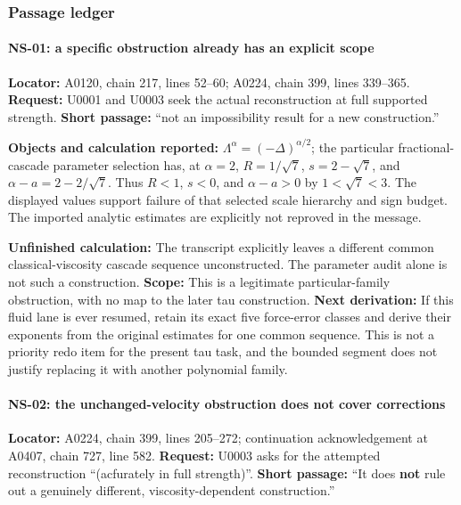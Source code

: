 \documentclass[10pt,a4paper,oneside]{report}
\begin{document}
\subsubsection{Passage ledger}\label{passage-ledger}

\paragraph{NS-01: a specific obstruction already has an explicit
scope}\label{ns-01-a-specific-obstruction-already-has-an-explicit-scope}

\textbf{Locator:} A0120, chain 217, lines 52--60; A0224, chain 399,
lines 339--365. \textbf{Request:} U0001 and U0003 seek the actual
reconstruction at full supported strength. \textbf{Short passage:} ``not
an impossibility result for a new construction.''

\textbf{Objects and calculation reported:}
\(\Lambda^\alpha=(-\Delta)^{\alpha/2}\); the particular
fractional-cascade parameter selection has, at \(\alpha=2\),
\(R=1/\sqrt7\), \(s=2-\sqrt7\), and \(\alpha-a=2-2/\sqrt7\). Thus
\(R<1\), \(s<0\), and \(\alpha-a>0\) by \(1<\sqrt7<3\). The displayed
values support failure of that selected scale hierarchy and sign budget.
The imported analytic estimates are explicitly not reproved in the
message.

\textbf{Unfinished calculation:} The transcript explicitly leaves a
different common classical-viscosity cascade sequence unconstructed. The
parameter audit alone is not such a construction. \textbf{Scope:} This
is a legitimate particular-family obstruction, with no map to the later
tau construction. \textbf{Next derivation:} If this fluid lane is ever
resumed, retain its exact five force-error classes and derive their
exponents from the original estimates for one common sequence. This is
not a priority redo item for the present tau task, and the bounded
segment does not justify replacing it with another polynomial family.

\paragraph{NS-02: the unchanged-velocity obstruction does not cover
corrections}\label{ns-02-the-unchanged-velocity-obstruction-does-not-cover-corrections}

\textbf{Locator:} A0224, chain 399, lines 205--272; continuation
acknowledgement at A0407, chain 727, line 582. \textbf{Request:} U0003
asks for the attempted reconstruction ``(acfurately in full strength)''.
\textbf{Short passage:} ``It does \textbf{not} rule out a genuinely
different, viscosity-dependent construction.''
\end{document}
